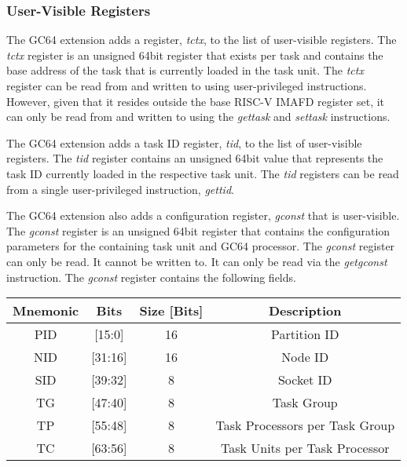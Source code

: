 \documentclass{article}
\begin{document}
\subsubsection{User-Visible Registers} 
The GC64 extension adds a register, \emph{tctx}, to the list of user-visible registers.  The \emph{tctx} register is an unsigned 64bit register that exists per task and contains the base address of the task that is currently loaded in the task unit. The \emph{tctx} register can be read from and written to using user-privileged instructions.  However, given that it resides outside the base RISC-V IMAFD register set, it can only be read from and written to using the \emph{gettask} and \emph{settask} instructions.  

\begin{center}
\end{center}

The GC64 extension adds a task ID register, \emph{tid}, to the list of user-visible registers.  The \emph{tid} register contains an unsigned 64bit value that represents the task ID currently loaded in the respective task unit.  The \emph{tid} registers can be read from a single user-privileged instruction, \emph{gettid}.  

\begin{center}
\end{center}

The GC64 extension also adds a configuration register, \emph{gconst} that is user-visible.  The \emph{gconst} register is an unsigned 64bit register that contains the configuration parameters for the containing task unit and GC64 processor.  The \emph{gconst} register can only be read.  It cannot be written to.  It can only be read via the \emph{getgconst} instruction.  The \emph{gconst} register contains the following fields.  

\begin{center}
\begin{tabular}{| c | c | c | c |}
\hline
Mnemonic & Bits & Size [Bits] & Description \\ 
\hline \hline
PID & [15:0] & 16 & Partition ID \\
\hline
NID & [31:16] & 16 & Node ID \\
\hline
SID & [39:32] & 8 & Socket ID \\
\hline
TG & [47:40] & 8 & Task Group \\
\hline 
TP & [55:48] & 8 & Task Processors per Task Group \\
\hline 
TC & [63:56] & 8 & Task Units per Task Processor \\
\hline 

\end{tabular}
\end{center} 
\end{document}
